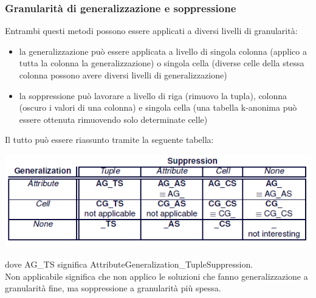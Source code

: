 \subsubsection{Granularità di generalizzazione e soppressione}
Entrambi questi metodi possono essere applicati a diversi livelli di granularità:
\begin{itemize}
    \item la generalizzazione può essere applicata a livello di singola colonna (applico a tutta la colonna la generalizzazione) o singola cella (diverse celle della stessa colonna possono avere diversi livelli di generalizzazione)
    \item la soppressione può lavorare a livello di riga (rimuovo la tupla), colonna (oscuro i valori di una colonna) e singola cella (una tabella k-anonima può essere ottenuta rimuovendo solo determinate celle)
\end{itemize}
Il tutto può essere riassunto tramite la seguente tabella:
\begin{center}
    \includegraphics[scale=0.7]{img/granularity.png}
\end{center}
dove AG\_TS significa AttributeGeneralization\_TupleSuppression.\\
Non applicabile significa che non applico le soluzioni che fanno generalizzazione a granularità fine, ma soppressione a granularità più spessa.
